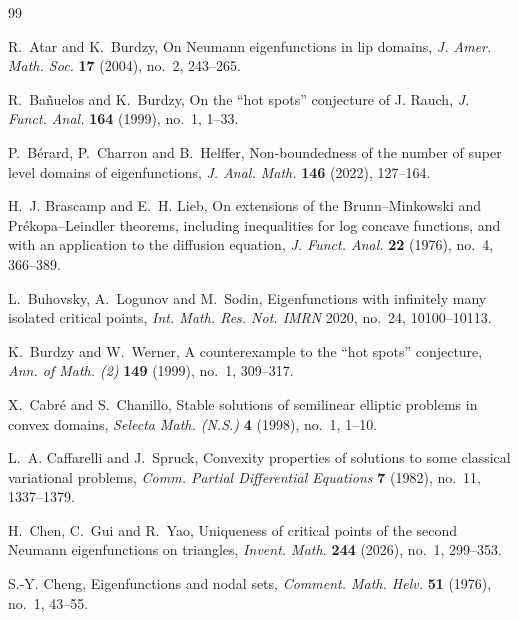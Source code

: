 \documentclass[11pt]{amsart}
\numberwithin{equation}{section}
\begin{document}
\begin{thebibliography}{99}

R.~Atar and K.~Burdzy,
\newblock On Neumann eigenfunctions in lip domains,
\newblock \emph{J. Amer. Math. Soc.} \textbf{17} (2004), no.~2, 243--265.

R.~Ba{\~n}uelos and K.~Burdzy,
\newblock On the ``hot spots'' conjecture of J. Rauch,
\newblock \emph{J. Funct. Anal.} \textbf{164} (1999), no.~1, 1--33.

P.~B\'erard, P.~Charron and B.~Helffer,
\newblock Non-boundedness of the number of super level domains of eigenfunctions,
\newblock \emph{J. Anal. Math.} \textbf{146} (2022), 127--164.

H.~J. Brascamp and E.~H. Lieb,
\newblock On extensions of the Brunn--Minkowski and Pr\'ekopa--Leindler theorems,
including inequalities for log concave functions, and with an application to the
diffusion equation,
\newblock \emph{J. Funct. Anal.} \textbf{22} (1976), no.~4, 366--389.

L.~Buhovsky, A.~Logunov and M.~Sodin,
\newblock Eigenfunctions with infinitely many isolated critical points,
\newblock \emph{Int. Math. Res. Not. IMRN} 2020, no.~24, 10100--10113.

K.~Burdzy and W.~Werner,
\newblock A counterexample to the ``hot spots'' conjecture,
\newblock \emph{Ann. of Math. (2)} \textbf{149} (1999), no.~1, 309--317.

X.~Cabr\'e and S.~Chanillo,
\newblock Stable solutions of semilinear elliptic problems in convex domains,
\newblock \emph{Selecta Math. (N.S.)} \textbf{4} (1998), no.~1, 1--10.

L.~A. Caffarelli and J.~Spruck,
\newblock Convexity properties of solutions to some classical variational problems,
\newblock \emph{Comm. Partial Differential Equations} \textbf{7} (1982),
no.~11, 1337--1379.

H.~Chen, C.~Gui and R.~Yao,
\newblock Uniqueness of critical points of the second Neumann eigenfunctions on triangles,
\newblock \emph{Invent. Math.} \textbf{244} (2026), no.~1, 299--353.

S.-Y. Cheng,
\newblock Eigenfunctions and nodal sets,
\newblock \emph{Comment. Math. Helv.} \textbf{51} (1976), no.~1, 43--55.


\end{thebibliography}
\end{document}
